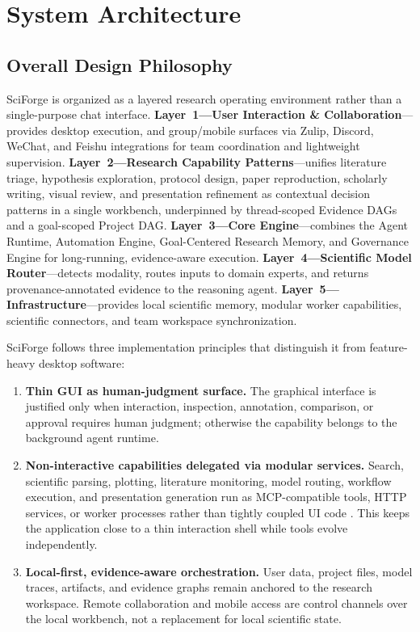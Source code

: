 \documentclass[sn-basic,Numbered,pdflatex]{sn-jnl}
\begin{document}
\section{System Architecture}

\subsection{Overall Design Philosophy}

SciForge is organized as a layered research operating environment rather than a single-purpose chat interface. \textbf{Layer~1---User Interaction \& Collaboration}---provides desktop execution, and group/mobile surfaces via Zulip, Discord, WeChat, and Feishu integrations for team coordination and lightweight supervision. \textbf{Layer~2---Research Capability Patterns}---unifies literature triage, hypothesis exploration, protocol design, paper reproduction, scholarly writing, visual review, and presentation refinement as contextual decision patterns in a single workbench, underpinned by thread-scoped Evidence DAGs and a goal-scoped Project DAG. \textbf{Layer~3---Core Engine}---combines the Agent Runtime, Automation Engine, Goal-Centered Research Memory, and Governance Engine for long-running, evidence-aware execution. \textbf{Layer~4---Scientific Model Router}---detects modality, routes inputs to domain experts, and returns provenance-annotated evidence to the reasoning agent. \textbf{Layer~5---Infrastructure}---provides local scientific memory, modular worker capabilities, scientific connectors, and team workspace synchronization.

SciForge follows three implementation principles that distinguish it from feature-heavy desktop software:

\begin{enumerate}
    \item \textbf{Thin GUI as human-judgment surface.} The graphical interface is justified only when interaction, inspection, annotation, comparison, or approval requires human judgment; otherwise the capability belongs to the background agent runtime.
    \item \textbf{Non-interactive capabilities delegated via modular services.} Search, scientific parsing, plotting, literature monitoring, model routing, workflow execution, and presentation generation run as MCP-compatible tools, HTTP services, or worker processes rather than tightly coupled UI code \cite{anthropicMCP2024}. This keeps the application close to a thin interaction shell while tools evolve independently.
    \item \textbf{Local-first, evidence-aware orchestration.} User data, project files, model traces, artifacts, and evidence graphs remain anchored to the research workspace. Remote collaboration and mobile access are control channels over the local workbench, not a replacement for local scientific state.
\end{enumerate}
\end{document}
